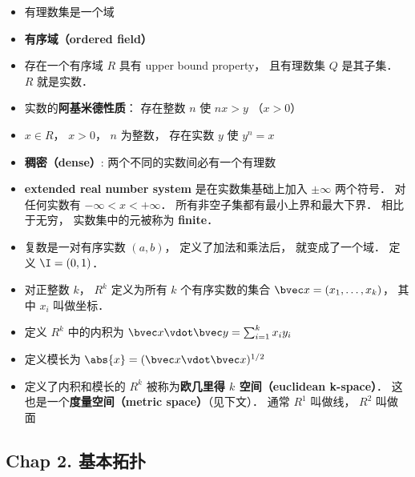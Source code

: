\begin{itemize}
\item 有理数集是一个域

\item \textbf{有序域（ordered field）}

\item 存在一个有序域 $R$ 具有 upper bound property， 且有理数集 $Q$ 是其子集． $R$ 就是实数．

\item 实数的\textbf{阿基米德性质}： 存在整数 $n$ 使 $nx > y$ （$x > 0$）

\item $x \in R$， $x > 0$， $n$ 为整数， 存在实数 $y$ 使 $y^n = x$

\item \textbf{稠密（dense）}: 两个不同的实数间必有一个有理数

\item \textbf{extended real number system} 是在实数集基础上加入 $\pm\infty$ 两个符号． 对任何实数有 $-\infty < x < +\infty$． 所有非空子集都有最小上界和最大下界． 相比于无穷， 实数集中的元被称为 \textbf{finite}．

\item 复数是一对有序实数 $(a, b)$， 定义了加法和乘法后， 就变成了一个域． 定义 $\I = (0, 1)$．

\item 对正整数 $k$， $R^k$ 定义为所有 $k$ 个有序实数的集合 $\bvec x = (x_1, \dots, x_k)$， 其中 $x_i$ 叫做坐标．

\item 定义 $R^k$ 中的内积为 $\bvec x \vdot \bvec y = \sum_{i = 1}^k x_i y_i$

\item 定义模长为 $\abs{x} = (\bvec x \vdot \bvec x)^{1/2}$

\item 定义了内积和模长的 $R^k$ 被称为\textbf{欧几里得 $k$ 空间（euclidean k-space）}． 这也是一个\textbf{度量空间（metric space）}（见下文）． 通常 $R^1$ 叫做线， $R^2$ 叫做面
\end{itemize}

\subsection{Chap 2. 基本拓扑}


